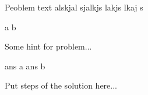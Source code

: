 

	\begin{problem}
		
		\begin{hint}
		\end{hint}

		\begin{answer}\end{answer}

		\begin{solution}
		\end{solution}
	\end{problem}


	\begin{problem}
		Peoblem text alskjal sjalkjs lakjs lkaj s
		\begin{exparts*}
			\partsitem a
			\partsitem b
		\end{exparts*}

		\begin{hint}
			Some hint for problem...
		\end{hint}

		\begin{answer}\begin{ansparts*}
			\partsitem ans a
			\partsitem ans b
		\end{ansparts*}\end{answer}

		\begin{solution}
			Put steps of the solution here...
		\end{solution}
	\end{problem}

